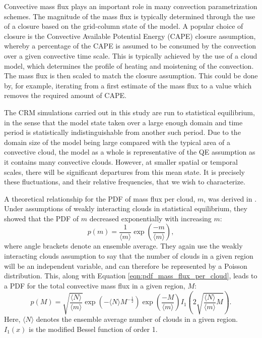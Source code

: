 \documentclass[11pt,a4paper]{article}
\begin{document}
Convective mass flux plays an important role in many convection parametrization schemes. The magnitude of the mass flux is typically determined through the use of a closure based on the grid-column state of the model. A popular choice of closure is the Convective Available Potential Energy (CAPE) closure assumption, whereby a percentage of the CAPE is assumed to be consumed by the convection over a given convective time scale. 
This is typically achieved by the use of a cloud model, which determines the profile of heating and moistening of the convection. The mass flux is then scaled to match the closure assumption. This could be done by, for example, iterating from a first estimate of the mass flux to a value which removes the required amount of CAPE.

The CRM simulations carried out in this study are run to statistical equilibrium, in the sense that the model state taken over a large enough domain and time period is statistically indistinguishable from another such period. Due to the domain size of the model being large compared with the typical area of a convective cloud, the model as a whole is representative of the QE assumption as it contains many convective clouds. However, at smaller spatial or temporal scales, there will be significant departures from this mean state. It is precisely these fluctuations, and their relative frequencies, that we wish to characterize.

A theoretical relationship for the PDF of mass flux per cloud, $m$, was derived in \cite{CC2006I}. Under assumptions of weakly interacting clouds in statistical equilibrium, they showed that the PDF of $m$ decreased exponentially with increasing $m$:
\begin{equation}
    p(m) = \frac{1}{\langle m \rangle} \exp \left(\frac{-m}{\langle m \rangle} \right),
    \label{eqn:pdf_mass_flux_per_cloud}
\end{equation}
where angle brackets denote an ensemble average. They again use the weakly interacting clouds assumption to say that the number of clouds in a given region will be an independent variable, and can therefore be represented by a Poisson distribution. This, along with Equation \ref{eqn:pdf_mass_flux_per_cloud}, leads to a PDF for the total convective mass flux in a given region, $M$:
\begin{equation}
    p(M) = \sqrt{\frac{\langle N \rangle}{\langle m \rangle}} \exp \left( -\langle N \rangle M^{-\frac{1}{2}} \right) \exp \left( \frac{-M}{\langle m \rangle} \right)  I_1\left(2 \sqrt{\frac{\langle N \rangle}{\langle m \rangle} M}\right).
    \label{eqn:pdf_mass_flux}
\end{equation}
Here, $\langle N \rangle$ denotes the ensemble average number of clouds in a given region. $I_1(x)$ is the modified Bessel function of order 1.
\end{document}
